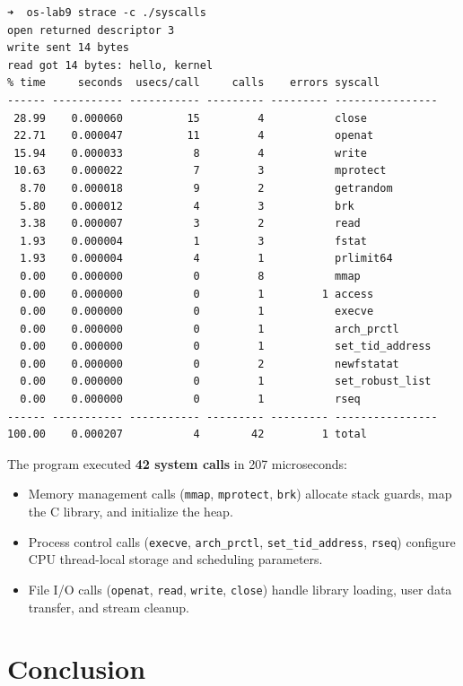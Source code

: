 \documentclass{labreport}
\begin{document}
\begin{lstlisting}[style=bash]
➜  os-lab9 strace -c ./syscalls
open returned descriptor 3
write sent 14 bytes
read got 14 bytes: hello, kernel
% time     seconds  usecs/call     calls    errors syscall
------ ----------- ----------- --------- --------- ----------------
 28.99    0.000060          15         4           close
 22.71    0.000047          11         4           openat
 15.94    0.000033           8         4           write
 10.63    0.000022           7         3           mprotect
  8.70    0.000018           9         2           getrandom
  5.80    0.000012           4         3           brk
  3.38    0.000007           3         2           read
  1.93    0.000004           1         3           fstat
  1.93    0.000004           4         1           prlimit64
  0.00    0.000000           0         8           mmap
  0.00    0.000000           0         1         1 access
  0.00    0.000000           0         1           execve
  0.00    0.000000           0         1           arch_prctl
  0.00    0.000000           0         1           set_tid_address
  0.00    0.000000           0         2           newfstatat
  0.00    0.000000           0         1           set_robust_list
  0.00    0.000000           0         1           rseq
------ ----------- ----------- --------- --------- ----------------
100.00    0.000207           4        42         1 total
\end{lstlisting}

The program executed \textbf{42 system calls} in 207 microseconds:
\begin{itemize}[noitemsep]
    \item Memory management calls (\texttt{mmap}, \texttt{mprotect}, \texttt{brk}) allocate stack guards, map the C library, and initialize the heap.
    \item Process control calls (\texttt{execve}, \texttt{arch\_prctl}, \texttt{set\_tid\_address}, \texttt{rseq}) configure CPU thread-local storage and scheduling parameters.
    \item File I/O calls (\texttt{openat}, \texttt{read}, \texttt{write}, \texttt{close}) handle library loading, user data transfer, and stream cleanup.
\end{itemize}

\section{Conclusion}
\end{document}

